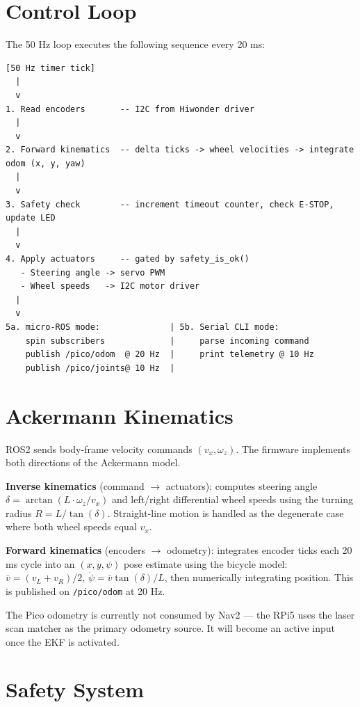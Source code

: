 \documentclass[12pt,a4paper]{report}
\begin{document}
\section{Control Loop}

The 50 Hz loop executes the following sequence every 20 ms:

\begin{lstlisting}
[50 Hz timer tick]
  |
  v
1. Read encoders       -- I2C from Hiwonder driver
  |
  v
2. Forward kinematics  -- delta ticks -> wheel velocities -> integrate odom (x, y, yaw)
  |
  v
3. Safety check        -- increment timeout counter, check E-STOP, update LED
  |
  v
4. Apply actuators     -- gated by safety_is_ok()
   - Steering angle -> servo PWM
   - Wheel speeds   -> I2C motor driver
  |
  v
5a. micro-ROS mode:              | 5b. Serial CLI mode:
    spin subscribers             |     parse incoming command
    publish /pico/odom  @ 20 Hz  |     print telemetry @ 10 Hz
    publish /pico/joints@ 10 Hz  |
\end{lstlisting}

\section{Ackermann Kinematics}

ROS2 sends body-frame velocity commands $(v_x, \omega_z)$. The firmware implements both directions of the Ackermann model.

\textbf{Inverse kinematics} (command $\rightarrow$ actuators): computes steering angle $\delta = \arctan(L \cdot \omega_z / v_x)$ and left/right differential wheel speeds using the turning radius $R = L / \tan(\delta)$. Straight-line motion is handled as the degenerate case where both wheel speeds equal $v_x$.

\textbf{Forward kinematics} (encoders $\rightarrow$ odometry): integrates encoder ticks each 20 ms cycle into an $(x, y, \psi)$ pose estimate using the bicycle model:
$\bar{v} = (v_L + v_R)/2$, $\dot{\psi} = \bar{v} \tan(\delta)/L$, then numerically integrating position. This is published on \texttt{/pico/odom} at 20 Hz.

The Pico odometry is currently not consumed by Nav2 --- the RPi5 uses the laser scan matcher as the primary odometry source. It will become an active input once the EKF is activated.

\section{Safety System}
\end{document}
